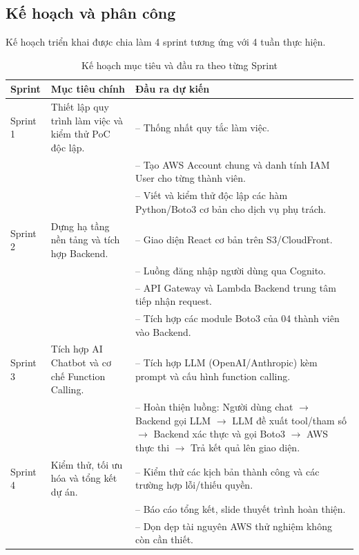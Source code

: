 \documentclass[a4paper,12pt]{article}
\newcommand{\bangfont}{\fontsize{12}{15}\selectfont}
\begin{document}
\subsection{Kế hoạch và phân công}
Kế hoạch triển khai được chia làm 4 sprint tương ứng với 4 tuần thực hiện.

\begin{table}[htbp]
\centering
\caption{Kế hoạch mục tiêu và đầu ra theo từng Sprint}
\label{tab:sprint_overview}
\bangfont
\begin{tabularx}{\linewidth}{@{}p{2.5cm}p{5cm}Y@{}}
\toprule
\textbf{Sprint} & \textbf{Mục tiêu chính} & \textbf{Đầu ra dự kiến}\\
\midrule
Sprint 1 & Thiết lập quy trình làm việc và kiểm thử PoC độc lập. & -- Thống nhất quy tắc làm việc.\\
& & -- Tạo AWS Account chung và danh tính IAM User cho từng thành viên.\\
& & -- Viết và kiểm thử độc lập các hàm Python/Boto3 cơ bản cho dịch vụ phụ trách.\\
\midrule
Sprint 2 & Dựng hạ tầng nền tảng và tích hợp Backend. & -- Giao diện React cơ bản trên S3/CloudFront.\\
& & -- Luồng đăng nhập người dùng qua Cognito.\\
& & -- API Gateway và Lambda Backend trung tâm tiếp nhận request.\\
& & -- Tích hợp các module Boto3 của 04 thành viên vào Backend.\\
\midrule
Sprint 3 & Tích hợp AI Chatbot và cơ chế Function Calling. & -- Tích hợp LLM (OpenAI/Anthropic) kèm prompt và cấu hình function calling.\\
& & -- Hoàn thiện luồng: Người dùng chat $\rightarrow$ Backend gọi LLM $\rightarrow$ LLM đề xuất tool/tham số $\rightarrow$ Backend xác thực và gọi Boto3 $\rightarrow$ AWS thực thi $\rightarrow$ Trả kết quả lên giao diện.\\
\midrule
Sprint 4 & Kiểm thử, tối ưu hóa và tổng kết dự án. & -- Kiểm thử các kịch bản thành công và các trường hợp lỗi/thiếu quyền.\\
& & -- Báo cáo tổng kết, slide thuyết trình hoàn thiện.\\
& & -- Dọn dẹp tài nguyên AWS thử nghiệm không còn cần thiết.\\
\bottomrule
\end{tabularx}
\end{table}
\end{document}
